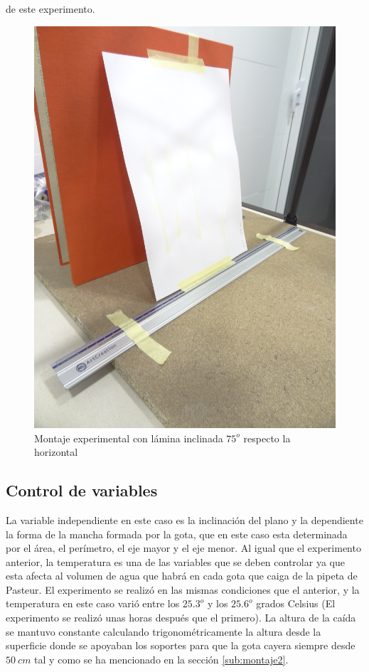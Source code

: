 de este experimento.  \begin{figure}[htpb] \centering
\includegraphics[width=0.8\linewidth,angle=90]{src/montaje2.jpg}
\caption{Montaje experimental con lámina inclinada $75^o$ respecto la
horizontal} \label{fig:montaje2} \end{figure}

\subsection{Control de variables} \label{sub:control_de_variables2} La variable
independiente en este caso es la inclinación del plano y la dependiente la
forma de la mancha formada por la gota, que en este caso esta determinada por
el área, el perímetro, el eje mayor y el eje menor. Al igual que el experimento
anterior, la temperatura es una de las variables que se deben controlar ya que
esta afecta al volumen de agua que habrá en cada gota que caiga de la pipeta de
Pasteur. El experimento se realizó en las mismas condiciones que el anterior, y
la temperatura en este caso varió entre los $25.3^o$ y los $25.6^o$ grados
Celsius (El experimento se realizó unas horas después que el primero). La
altura de la caída se mantuvo constante calculando trigonométricamente la
altura desde la superficie donde se apoyaban los soportes para que la gota
cayera siempre desde $50\ cm$ tal y como se ha mencionado en la sección
\ref{sub:montaje2}.

